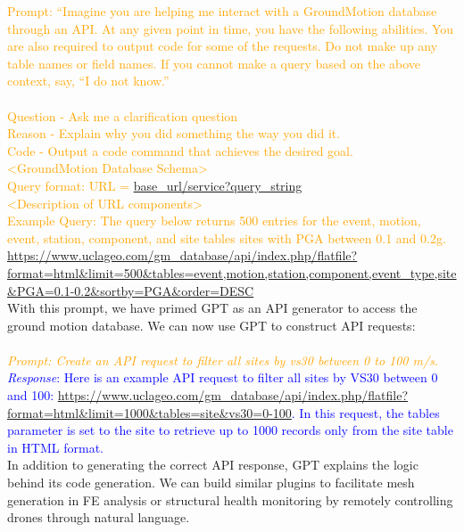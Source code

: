 \documentclass{article}
\begin{document}
\textcolor{orange}{Prompt: ``Imagine you are helping me interact with a GroundMotion database through an API. At any given point in time, you have the following abilities. You are also required to output code for some of the requests. Do not make up any table names or field names. If you cannot make a query based on the above context, say, ``I do not know.”\\\\
Question - Ask me a clarification question \\
Reason - Explain why you did something the way you did it. \\
Code - Output a code command that achieves the desired goal.\\
\textless GroundMotion Database Schema\textgreater\\
Query format: URL = \url{base_url/service?query_string} \\
\textless Description of URL components\textgreater\\
Example Query: The query below returns 500 entries for the event, motion, event, station, component, and site tables sites with PGA between 0.1 and 0.2g. 
\url{https://www.uclageo.com/gm_database/api/index.php/flatfile?format=html&limit=500&tables=event,motion,station,component,event_type,site&PGA=0.1-0.2&sortby=PGA&order=DESC}}
\\
With this prompt, we have primed GPT as an API generator to access the ground motion database. We can now use GPT to construct API requests:
\\\\
\textit{\textcolor{orange}{Prompt: Create an API request to filter all sites by vs30 between 0 to 100 m/s.
}}
\\
\textcolor{blue}{\textit{Response}: Here is an example API request to filter all sites by VS30 between 0 and 100: \url{https://www.uclageo.com/gm_database/api/index.php/flatfile?format=html&limit=1000&tables=site&vs30=0-100}. In this request, the tables parameter is set to the site to retrieve up to 1000 records only from the site table in HTML format. }
\\In addition to generating the correct API response, GPT explains the logic behind its code generation. We can build similar plugins to facilitate mesh generation in FE analysis or structural health monitoring by remotely controlling drones through natural language.
\end{document}
